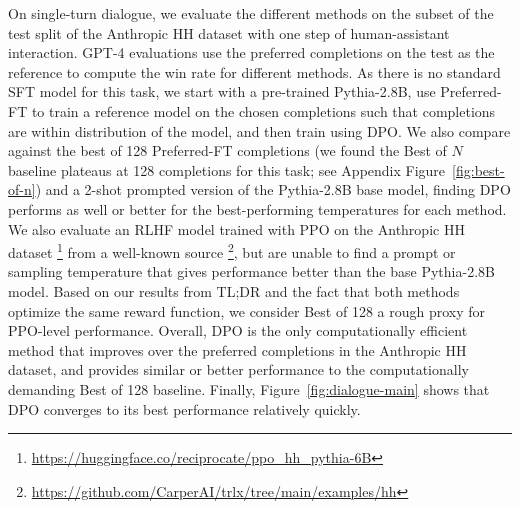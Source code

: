 On single-turn dialogue, we evaluate the different methods on the subset of the test split of the Anthropic HH dataset \citep{bai2022training} with one step of human-assistant interaction. GPT-4 evaluations use the preferred completions on the test as the reference to compute the win rate for different methods. As there is no standard SFT model for this task, we start with a pre-trained Pythia-2.8B, use Preferred-FT to train a reference model on the chosen completions such that completions are within distribution of the model, and then train using DPO. We also compare against the best of 128 Preferred-FT completions (we found the Best of $N$ baseline plateaus at 128 completions for this task; see Appendix Figure~\ref{fig:best-of-n}) and a 2-shot prompted version of the Pythia-2.8B base model, finding DPO performs as well or better for the best-performing temperatures for each method. We also evaluate an RLHF model trained with PPO on the Anthropic HH dataset \footnote{\url{https://huggingface.co/reciprocate/ppo_hh_pythia-6B}} from a well-known source \footnote{\url{https://github.com/CarperAI/trlx/tree/main/examples/hh}}, but are unable to find a prompt or sampling temperature that gives performance better than the base Pythia-2.8B model. Based on our results from TL;DR and the fact that both methods optimize the same reward function, we consider Best of 128 a rough proxy for PPO-level performance. Overall, DPO is the only computationally efficient method that improves over the preferred completions in the Anthropic HH dataset, and provides similar or better performance to the computationally demanding Best of 128 baseline. Finally, Figure~\ref{fig:dialogue-main} shows that DPO converges to its best performance relatively quickly.